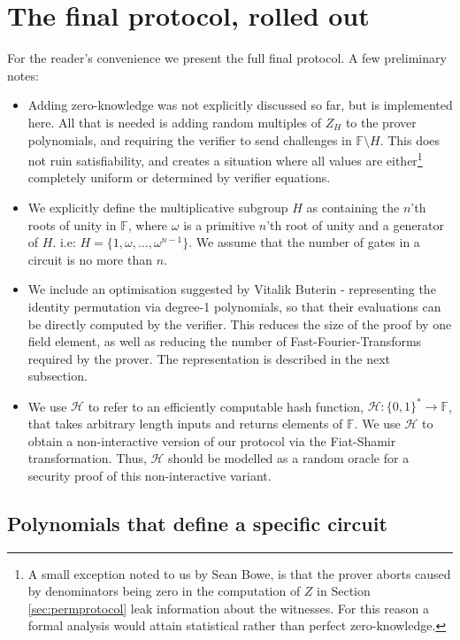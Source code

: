 \documentclass[11pt]{article} %
\newcommand{\F}{\ensuremath{\mathbb F}\xspace}
\newcommand{\hash}{\ensuremath{\mathcal{H}}\xspace}
\begin{document}
 
 
 \section{The final protocol, rolled out}\label{sec:finalconst}
 For the reader's convenience we present the full final protocol. 
 A few preliminary notes:
\begin{itemize}
 \item  Adding zero-knowledge was not explicitly discussed so far, but is implemented here.
 All that is needed is adding random multiples of $Z_{H}$ to the prover polynomials, and requiring the verifier to send challenges in $\F\setminus H$. This does not ruin satisfiability, and creates a situation where all values are either\footnote{A small  exception noted to us by Sean Bowe, is that the prover aborts caused by  denominators being zero in the computation of $Z$ in Section \ref{sec:permprotocol} leak information about the witnesses. For this reason a formal analysis would attain statistical rather than perfect zero-knowledge.} completely uniform or determined by verifier equations.
\item We explicitly define the multiplicative subgroup $H$ as containing the $n$'th roots of unity in $\F$, where $\omega$ is a primitive $n$'th root of unity and a generator of $H$. i.e: $H = \{1, \omega, \ldots, \omega^{n-1}\}$. We assume that the number of gates in a circuit is no more than $n$.
\item  We include an optimisation suggested by Vitalik Buterin - representing the identity permutation via degree-1 polynomials, so that their evaluations can be directly computed by the verifier. This reduces the size of the proof by one field element, as well as reducing the number of Fast-Fourier-Transforms required by the prover. The representation is described in the next subsection.
\item We use \hash to refer to an efficiently computable hash function, $\hash:\{0,1\}^*\to \F$, that takes arbitrary length inputs and returns elements of \F. We use \hash to obtain a non-interactive version of our protocol via the Fiat-Shamir transformation. Thus, \hash should be modelled as a random oracle for a security proof of this non-interactive variant.
\end{itemize}

\subsection{Polynomials that define a specific circuit}
\end{document}
